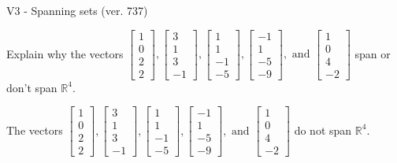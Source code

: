 \begin{exercise}
  \begin{exerciseTitle}V3 - Spanning sets (ver. 737)\end{exerciseTitle}
  \begin{exerciseStatement}
    Explain why the vectors \(\left[\begin{array}{r}
1 \\
0 \\
2 \\
2
\end{array}\right] , \left[\begin{array}{r}
3 \\
1 \\
3 \\
-1
\end{array}\right] , \left[\begin{array}{r}
1 \\
1 \\
-1 \\
-5
\end{array}\right] , \left[\begin{array}{r}
-1 \\
1 \\
-5 \\
-9
\end{array}\right] , \text{ and } \left[\begin{array}{r}
1 \\
0 \\
4 \\
-2
\end{array}\right]\) span or don't span \(\mathbb{R}^4\). 
	


  \end{exerciseStatement}
  \begin{exerciseAnswer}
   The vectors \(\left[\begin{array}{r}
1 \\
0 \\
2 \\
2
\end{array}\right] , \left[\begin{array}{r}
3 \\
1 \\
3 \\
-1
\end{array}\right] , \left[\begin{array}{r}
1 \\
1 \\
-1 \\
-5
\end{array}\right] , \left[\begin{array}{r}
-1 \\
1 \\
-5 \\
-9
\end{array}\right] , \text{ and } \left[\begin{array}{r}
1 \\
0 \\
4 \\
-2
\end{array}\right]\) 
  	 do not  
	span \(\mathbb{R}^4\).
  



\end{exerciseAnswer}
\end{exercise}
